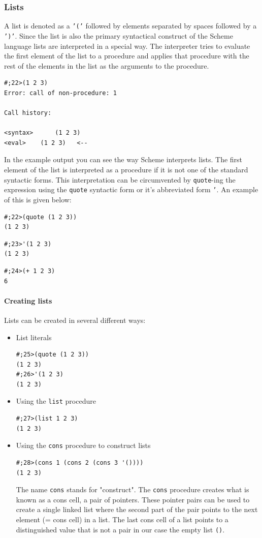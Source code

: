 \documentclass[12pt,a4paper,english,twoside]{article}
\begin{document}
\subsubsection{Lists}
A list is denoted as a \texttt{'('} followed by elements separated by spaces 
followed by a \texttt{')'}. Since the list is also the primary syntactical 
construct of the Scheme language lists are interpreted in a special way. The 
interpreter tries to evaluate the first element of the list to a procedure and 
applies that procedure with the rest of the elements in the list as the 
arguments to the procedure.
\begin{lstlisting}
#;22>(1 2 3)
Error: call of non-procedure: 1

Call history:

<syntax>	  (1 2 3)
<eval>	  (1 2 3)	<--

\end{lstlisting}
In the example output you can see the way Scheme interprets lists. The first 
element of the list is interpreted as a procedure if it is not one of the 
standard syntactic forms. This interpretation can be circumvented by 
\texttt{quote}-ing the expression using the \texttt{quote} syntactic form or 
it's abbreviated form \texttt{'}. An example of this is given below:
\begin{lstlisting}
#;22>(quote (1 2 3))
(1 2 3)
\end{lstlisting}
\begin{lstlisting}
#;23>'(1 2 3)
(1 2 3)
\end{lstlisting}
\begin{lstlisting}
#;24>(+ 1 2 3)
6
\end{lstlisting}
\paragraph{Creating lists}
Lists can be created in several different ways:
\begin{itemize}
\item List literals \begin{lstlisting}
#;25>(quote (1 2 3))
(1 2 3)
#;26>'(1 2 3)
(1 2 3)
\end{lstlisting}
\item Using the \texttt{list} procedure
\begin{lstlisting}
#;27>(list 1 2 3)
(1 2 3)
\end{lstlisting}
\item Using the \texttt{cons} procedure to construct lists  \begin{lstlisting}
#;28>(cons 1 (cons 2 (cons 3 '())))
(1 2 3)
\end{lstlisting}
The name \texttt{cons} stands for "construct". The \texttt{cons} procedure 
creates what is known as a cons cell, a pair of pointers. These pointer pairs 
can be used to create a single linked list where the second part of the pair 
points to the next element (= cons cell) in a list. The last cons cell of a 
list points to a distinguished value that is not a pair in our case the empty 
list \texttt{()}.  \end{itemize}
\end{document}
